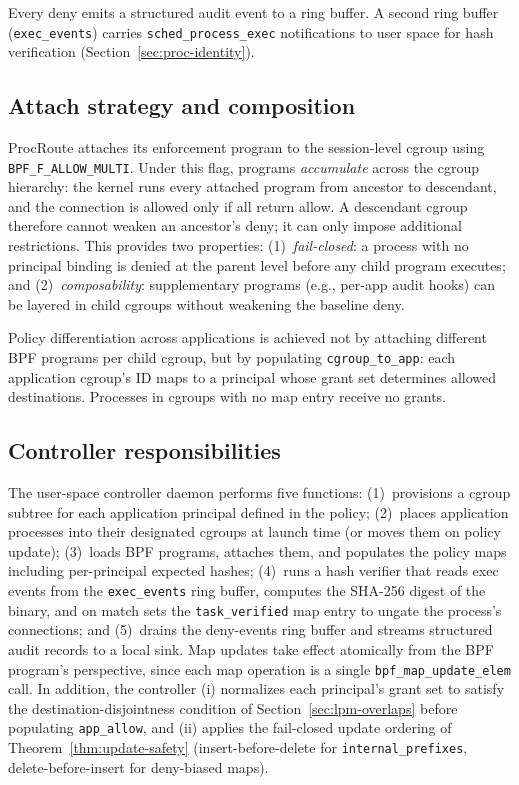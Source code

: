 \documentclass[sigconf]{acmart}
\begin{document}
\noindent
Every deny emits a structured audit event to a ring buffer.  A second ring buffer
(\texttt{exec\_events}) carries
\texttt{sched\_\allowbreak process\_exec} notifications to
user space for hash verification
(Section~\ref{sec:proc-identity}).

\subsection{Attach strategy and composition}
\label{sec:attach-flags}

ProcRoute attaches its enforcement program to the session-level
cgroup using \texttt{BPF\_F\_ALLOW\_MULTI}.  Under this flag,
programs \emph{accumulate} across the cgroup hierarchy: the kernel
runs every attached program from ancestor to descendant, and the
connection is allowed only if all return allow.  A descendant cgroup
therefore cannot weaken an ancestor's deny; it can only impose
additional restrictions.  This provides two properties:
(1)~\emph{fail-closed}: a process with no principal binding is
denied at the parent level before any child program executes; and
(2)~\emph{composability}: supplementary programs (e.g., per-app
audit hooks) can be layered in child cgroups without weakening the
baseline deny.

Policy differentiation across applications is achieved not by
attaching different BPF programs per child cgroup, but by
populating \texttt{cgroup\_to\_app}: each application cgroup's ID
maps to a principal whose grant set determines allowed destinations.
Processes in cgroups with no map entry receive no grants.

\subsection{Controller responsibilities}

The user-space controller daemon performs five functions:
(1)~provisions a cgroup subtree for each application principal
defined in the policy;
(2)~places application processes into their designated cgroups at
launch time (or moves them on policy update);
(3)~loads BPF programs, attaches them, and populates the
policy maps including per-principal expected hashes;
(4)~runs a hash verifier that reads exec events from the
\texttt{exec\_events} ring buffer, computes the SHA-256 digest
of the binary,
and on match sets the \texttt{task\_verified} map entry to
ungate the process's connections; and
(5)~drains the deny-events ring buffer and streams structured
audit records to a local sink.
Map updates take effect atomically from the BPF program's perspective, since each
map operation is a single \texttt{bpf\_map\_update\_elem} call.
In addition, the controller (i) normalizes each principal's grant set
to satisfy the destination-disjointness condition of
Section~\ref{sec:lpm-overlaps} before populating \texttt{app\_allow},
and (ii) applies the fail-closed update ordering of
Theorem~\ref{thm:update-safety} (insert-before-delete for
\texttt{internal\_prefixes}, delete-before-insert for deny-biased
maps).
\end{document}
